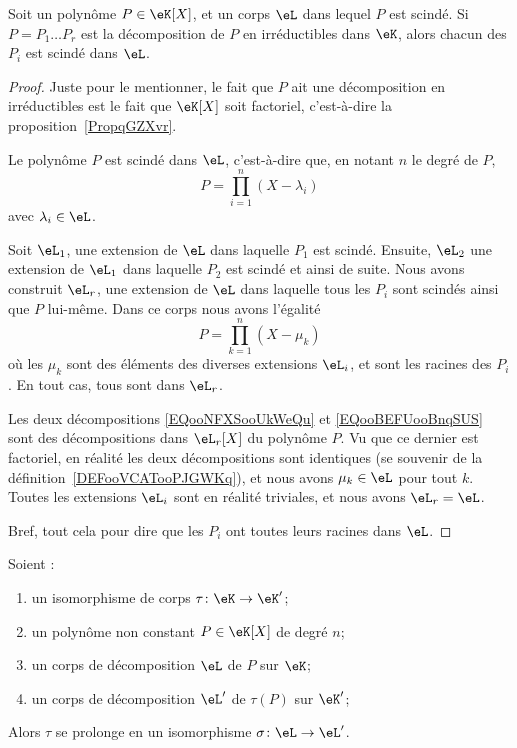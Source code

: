 \begin{lemma}        \label{LEMooJNGWooTXdGre}
	Soit un polynôme \( P\in \eK[X]\), et un corps \( \eL\) dans lequel \( P\) est scindé. Si \( P=P_1\ldots P_r\) est la décomposition de \( P\) en irréductibles dans \( \eK\), alors chacun des \( P_i\) est scindé dans \( \eL\).
\end{lemma}

\begin{proof}
	Juste pour le mentionner, le fait que \( P\) ait une décomposition en irréductibles est le fait que \( \eK[X]\) soit factoriel, c'est-à-dire la proposition~\ref{PropqGZXvr}.

	Le polynôme \( P\) est scindé dans \( \eL\), c'est-à-dire que, en notant \( n\) le degré de \( P\),
	\begin{equation}        \label{EQooNFXSooUkWeQu}
		P=\prod_{i=1}^n(X-\lambda_i)
	\end{equation}
	avec \( \lambda_i\in \eL\).

	Soit \( \eL_1\), une extension de \( \eL\) dans laquelle \( P_1\) est scindé. Ensuite, \( \eL_2\) une extension de \( \eL_1\) dans laquelle \( P_2\) est scindé et ainsi de suite. Nous avons construit \( \eL_r\), une extension de \( \eL\) dans laquelle tous les \( P_i\) sont scindés ainsi que \( P\) lui-même. Dans ce corps nous avons l'égalité
	\begin{equation}        \label{EQooBEFUooBnqSUS}
		P=\prod_{k=1}^n(X-\mu_k)
	\end{equation}
	où les \( \mu_k\) sont des éléments des diverses extensions \( \eL_i\), et sont les racines des \( P_i\). En tout cas, tous sont dans \( \eL_r\).

	Les deux décompositions \eqref{EQooNFXSooUkWeQu} et \eqref{EQooBEFUooBnqSUS} sont des décompositions dans \( \eL_r[X]\) du polynôme \( P\). Vu que ce dernier est factoriel, en réalité les deux décompositions sont identiques (se souvenir de la définition~\ref{DEFooVCATooPJGWKq}), et nous avons \( \mu_k\in \eL\) pour tout \( k\). Toutes les extensions \( \eL_i\) sont en réalité triviales, et nous avons \( \eL_r=\eL\).

	Bref, tout cela pour dire que les \( P_i\) ont toutes leurs racines dans \( \eL\).
\end{proof}

\begin{theorem}      \label{THOooQVKWooZAAYxK}
	Soient :
	\begin{enumerate}
		\item un isomorphisme de corps \( \tau\colon \eK\to \eK'\);
		\item un polynôme non constant \( P\in \eK[X]\) de degré \( n\);
		\item un corps de décomposition \( \eL\) de \( P\) sur \( \eK\);
		\item un corps de décomposition \( \eL'\) de \( \tau(P)\) sur \( \eK'\);
	\end{enumerate}
	Alors \( \tau\) se prolonge en un isomorphisme \( \sigma\colon \eL\to \eL'\).
\end{theorem}

